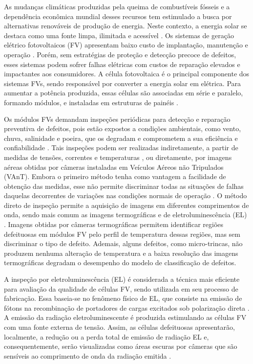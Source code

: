 \documentclass[a4paper]{ifacconf}
\begin{document}
As mudanças climáticas produzidas pela queima de combustíveis fósseis e a dependência econômica mundial desses recursos tem estimulado a busca por alternativas renováveis de produção de energia. Neste contexto, a energia solar se destaca como uma fonte limpa, ilimitada e acessível \citep{SinghChaudhary2018}. Os sistemas de geração elétrico fotovoltaicos (FV) apresentam baixo custo de implantação, manutenção e operação \citep{Guerriero2019}. Porém, sem estratégias de proteção e detecção precoce de defeitos, esses sistemas podem sofrer falhas elétricas com custos de reparação elevados e impactantes aos consumidores. A célula fotovoltaica é o principal componente dos sistemas FVs, sendo responsável por converter a energia solar em elétrica. Para aumentar a potência produzida, essas células são associadas em série e paralelo, formando módulos, e instaladas em estruturas de painéis \citep{SinghChaudhary2018}.  

Os módulos FVs demandam inspeções periódicas para detecção e reparação preventiva de defeitos, pois estão expostos a condições ambientais, como vento, chuva, salinidade e poeira, que os degradam e comprometem a sua eficiência e confiabilidade \citep{Kim2017}. Tais inspeções podem ser realizadas indiretamente, a partir de medidas de tensões, correntes e temperaturas \citep{SanchezPacheco2014}, ou diretamente, por imagens aéreas obtidas por câmeras instaladas em Veículos Aéreos não Tripulados (VAnT). Embora o primeiro método tenha como vantagem a facilidade de obtenção das medidas, esse não permite discriminar todas as situações de falhas daquelas decorrentes de variações nas condições normais de operação \citep{Basnet2020}.  O método direto de inspeção permite a aquisição de imagens em diferentes comprimentos de onda, sendo mais comum as imagens termográficas \citep{Kim2017} e de  eletroluminescência (EL) \citep{TANG2020453}. Imagens obtidas por câmeras termográficas permitem identificar regiões defeituosas em módulos FV pelo perfil de temperatura dessas regiões, mas sem discriminar o tipo de defeito. Ademais, alguns defeitos, como micro-trincas, não produzem nenhuma alteração de temperatura e a baixa resolução das imagens termográficas degradam o desempenho do modelo de classificação de defeitos. 

A inspeção por eletroluminescência (EL) é considerada a técnica mais eficiente para avaliação da qualidade de células FV, sendo utilizada em seu processo de fabricação. Essa baseia-se no fenômeno físico de EL, que consiste na emissão de fótons na recombinação de portadores de cargas excitados sob polarização direta \citep{FRAZAO20177}. A emissão da radiação eletroluminescente é produzida estimulando as células FV com uma fonte externa de tensão. Assim, as células defeituosas apresentarão, localmente, a redução ou a perda total de emissão de radiação EL e, consequentemente, serão visualizadas como áreas escuras por câmeras que são sensíveis ao comprimento de onda da radiação emitida \citep{DJORDJEVIC2014215}. 
\end{document}
